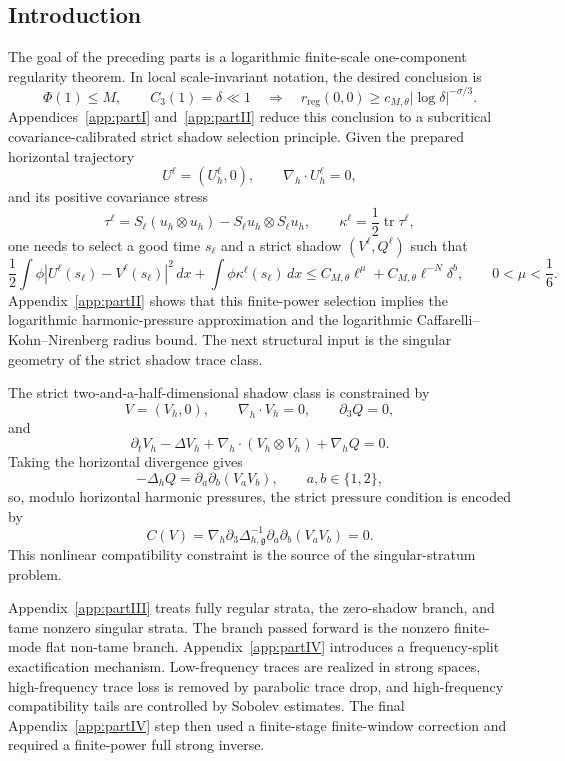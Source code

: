 \documentclass[11pt]{article}
\numberwithin{equation}{section}
\theoremstyle{plain}
\theoremstyle{definition}
\theoremstyle{remark}
\newcommand{\reg}{\mathrm{reg}}
\newcommand{\tr}{\operatorname{tr}}
\newcommand{\dx}{\,dx}
\newcommand{\nabh}{\nabla_h}
\newcommand{\divh}{\nabla_h\!\cdot}
\begin{document}
\subsection{Introduction}

The goal of the preceding parts is a logarithmic finite-scale one-component regularity theorem.  In local scale-invariant notation, the desired conclusion is
\[
        \Phi(1)\le M,
        \qquad
        C_3(1)=\delta\ll1
        \quad\Longrightarrow\quad
        r_{\reg}(0,0)\ge c_{M,\theta}|\log\delta|^{-\sigma/3}.
\]
Appendices~\ref{app:partI} and~\ref{app:partII} reduce this conclusion to a subcritical covariance-calibrated strict shadow selection principle.  Given the prepared horizontal trajectory
\[
        U^\ell=(U_h^\ell,0),
        \qquad
        \divh U_h^\ell=0,
\]
and its positive covariance stress
\[
        \tau^\ell=S_\ell(u_h\otimes u_h)-S_\ell u_h\otimes S_\ell u_h,
        \qquad
        \kappa^\ell=\frac12\tr\tau^\ell,
\]
one needs to select a good time \(s_\ell\) and a strict shadow \((V^\ell,Q^\ell)\) such that
\[
        \frac12\int \phi |U^\ell(s_\ell)-V^\ell(s_\ell)|^2\dx
        +
        \int\phi\kappa^\ell(s_\ell)\dx
        \le
        C_{M,\theta}\ell^\mu+C_{M,\theta}\ell^{-N}\delta^b,
        \qquad
        0<\mu<\frac16.
\]
Appendix~\ref{app:partII} shows that this finite-power selection implies the logarithmic harmonic-pressure approximation and the logarithmic Caffarelli--Kohn--Nirenberg radius bound.  The next structural input is the singular geometry of the strict shadow trace class.

The strict two-and-a-half-dimensional shadow class is constrained by
\[
        V=(V_h,0),
        \qquad
        \divh V_h=0,
        \qquad
        \partial_3Q=0,
\]
and
\[
        \partial_tV_h-\Delta V_h+\nabh\cdot(V_h\otimes V_h)+\nabh Q=0.
\]
Taking the horizontal divergence gives
\[
        -\Delta_hQ=\partial_a\partial_b(V_aV_b),
        \qquad a,b\in\{1,2\},
\]
so, modulo horizontal harmonic pressures, the strict pressure condition is encoded by
\[
        C(V)=\nabh\partial_3\Delta_{h,\mathfrak g}^{-1}\partial_a\partial_b(V_aV_b)=0.
\]
This nonlinear compatibility constraint is the source of the singular-stratum problem.

Appendix~\ref{app:partIII} treats fully regular strata, the zero-shadow branch, and tame nonzero singular strata.  The branch passed forward is the nonzero finite-mode flat non-tame branch.  Appendix~\ref{app:partIV} introduces a frequency-split exactification mechanism.  Low-frequency traces are realized in strong spaces, high-frequency trace loss is removed by parabolic trace drop, and high-frequency compatibility tails are controlled by Sobolev estimates.  The final Appendix~\ref{app:partIV} step then used a finite-stage finite-window correction and required a finite-power full strong inverse.
\end{document}
